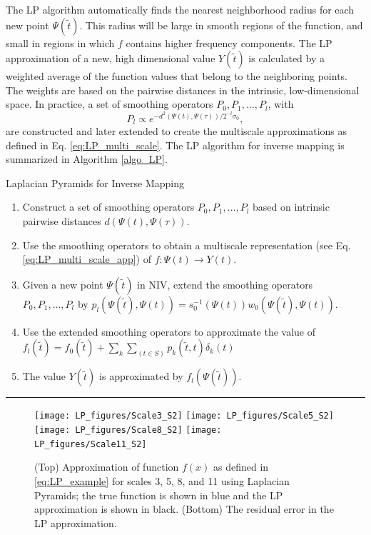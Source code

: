 \documentclass[aip,jcp,preprint]{revtex4-1}
\begin{document}
The LP algorithm automatically finds the nearest neighborhood radius for each new point $\Psi(\tilde{t})$.
%
This radius will be large in smooth regions of the function, and small in regions in which $f$ contains higher frequency components.
%
The LP approximation of a new, high dimensional value $Y(\tilde{t})$ is calculated by a weighted average of the function values that belong to the neighboring points.
%
The weights are based on the pairwise distances in the intrinsic, low-dimensional space.
%
In practice, a set of smoothing operators $P_0, P_1, \ldots, P_l$, with
\begin{equation} \label{eq:LP_multi_scale_app}
P_l \propto e^{-d^2(\Psi(t),\Psi(\tau)) / 2^{-l} \sigma_0},
\end{equation}
are constructed and later extended to create the multiscale approximations as defined in Eq. \ref{eq:LP_multi_scale}.
%
The LP algorithm for inverse mapping is summarized in Algorithm \ref{algo_LP}.

\begin{algorithm}[th!]
\caption{Laplacian Pyramids for Inverse Mapping}
\begin{enumerate}

\item
Construct a set of smoothing operators $P_0, P_1, \ldots, P_l$  based on intrinsic pairwise distances $d(\Psi(t),\Psi(\tau))$.

\item
Use the smoothing operators to obtain a multiscale representation (see Eq. \ref{eq:LP_multi_scale_app}) of $f:\Psi(t) \rightarrow Y(t)$.

\item Given a new point $\Psi(\tilde{t})$ in NIV, extend the smoothing operators $P_0, P_1, \ldots, P_l$  by
$p_l(\Psi(\tilde{t}), \Psi(t)) = s_0^{-1}(\Psi(t))w_0(\Psi(\tilde{t}),\Psi(t))$.

\item
Use the extended smoothing operators to approximate the value of $f_l(\tilde{t}) = f_0(\tilde{t}) + \sum_{k}\sum_{(t \in S)}p_k(\tilde{t}, t)\delta_k(t)$

\item
The value $Y(\tilde{t})$ is approximated by $f_l(\Psi(\tilde{t}))$.

\end{enumerate}
\hrule
\label{algo_LP}
\end{algorithm}


\begin{figure}[ht]
\texttt{[image: LP\_figures/Scale3\_S2]}
\texttt{[image: LP\_figures/Scale5\_S2]}
\texttt{[image: LP\_figures/Scale8\_S2]}
\texttt{[image: LP\_figures/Scale11\_S2]}
\caption{(Top) Approximation of function $f(x)$ as defined in \eqref{eq:LP_example} for scales 3, 5, 8, and 11 using Laplacian Pyramids; the true function is shown in blue and the LP approximation is shown in black. (Bottom) The residual error in the LP approximation.}
\label{fig:LP_ex}
\end{figure}
\end{document}
